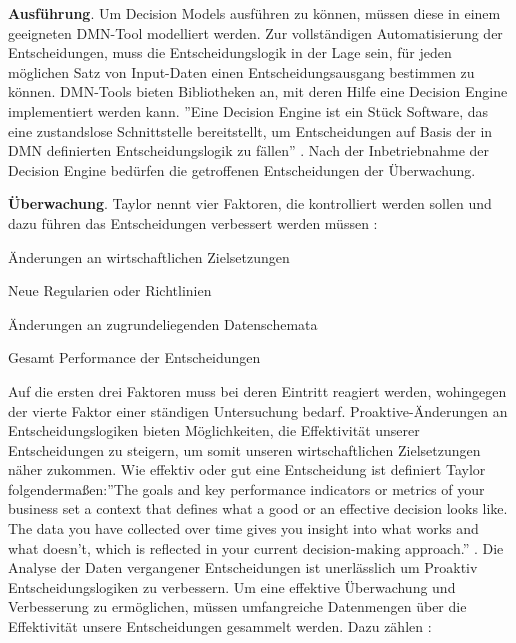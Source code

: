 \textbf{Ausführung}. Um Decision Models ausführen zu können, müssen diese in einem geeigneten DMN-Tool modelliert werden. Zur vollständigen Automatisierung der Entscheidungen, muss die Entscheidungslogik in der Lage sein, für jeden möglichen Satz von Input-Daten einen
Entscheidungsausgang bestimmen zu können. DMN-Tools bieten Bibliotheken an, mit deren Hilfe eine Decision Engine implementiert werden kann. ''Eine Decision Engine ist ein Stück Software, das eine zustandslose Schnittstelle bereitstellt, um Entscheidungen auf Basis der in DMN definierten Entscheidungslogik zu fällen'' \cite[S. 41]{BR16}. Nach der Inbetriebnahme der Decision Engine bedürfen die getroffenen Entscheidungen der Überwachung.

\textbf{Überwachung}. Taylor nennt vier Faktoren, die kontrolliert werden sollen und dazu führen das Entscheidungen verbessert werden müssen \cite[vgl. S. 158]{JT11}:

\begin{enumerate*}
\item Änderungen an wirtschaftlichen Zielsetzungen
\item Neue Regularien oder Richtlinien
\item Änderungen an zugrundeliegenden Datenschemata  
\item Gesamt Performance der Entscheidungen\end{enumerate*}   

Auf die ersten drei Faktoren muss bei deren Eintritt reagiert werden, wohingegen der vierte Faktor einer ständigen Untersuchung bedarf. Proaktive-Änderungen an Entscheidungslogiken bieten Möglichkeiten, die Effektivität unserer Entscheidungen zu steigern, um somit unseren wirtschaftlichen Zielsetzungen näher zukommen. Wie effektiv oder gut eine Entscheidung ist definiert Taylor folgendermaßen:''The goals and key performance indicators or metrics of your business set a context that defines what a good or an effective decision looks like. The data you have collected over time gives you insight into what works and what doesn't, which is reflected in your current decision-making approach.'' \cite[vgl. S. 159]{JT11}. Die Analyse der Daten vergangener Entscheidungen ist unerlässlich um Proaktiv Entscheidungslogiken zu verbessern. Um eine effektive Überwachung und Verbesserung zu ermöglichen, müssen umfangreiche Datenmengen über die Effektivität unsere Entscheidungen gesammelt werden. Dazu zählen \cite[vgl. S. 164]{JT11}:

